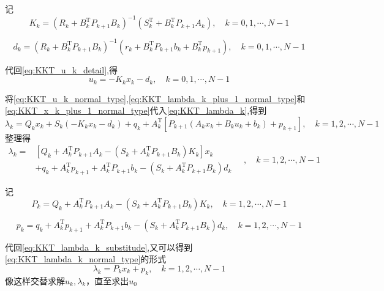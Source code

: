\documentclass[withoutpreface,bwprint]{NoteBook}
\begin{document}
记
\begin{equation}
\label{eq:KKT_K_k_detail}
K_{k} = \left( R_{k}+B_{k}^\mathrm{T}P_{k+1} B_{k} \right)^{-1} \left( S_{k}^\mathrm{T} + B_{k}^\mathrm{T} P_{k+1} A_{k} \right) 
, \quad k=0,1,\cdots,N-1
\end{equation}

\begin{equation}
\label{eq:KKT_d_k_detail}
d_{k} = \left( R_{k}+B_{k}^\mathrm{T}P_{k+1} B_{k} \right)^{-1} \left( r_{k}+ B_{k}^\mathrm{T} P_{k+1} b_{k}+B_{k}^\mathrm{T} p_{k+1} \right)
, \quad k=0,1,\cdots,N-1
\end{equation}


代回\cref{eq:KKT_u_k_detail},得
\begin{equation}
\label{eq:KKT_u_k_normal_type}
u_{k} = -K_k x_{k} -d_k
, \quad k=0,1,\cdots,N-1
\end{equation}

将\cref{eq:KKT_u_k_normal_type},\cref{eq:KKT_lambda_k_plus_1_normal_type}和\cref{eq:KKT_x_k_plus_1_normal_type}代入\cref{eq:KKT_lambda_k},得到
$$
\lambda_{k}=Q_k x_k + S_k \left( -K_k x_{k} -d_k \right) +q_k + A_k^\mathrm{T}\left[P_{k+1} \left(A_k x_k + B_k u_k + b_k \right) + p_{k+1}\right]
, \quad k=1,2,\cdots,N-1
$$
整理得
\begin{equation}
\label{eq:KKT_lambda_k_substitude}
\begin{aligned}
\lambda_{k} =& \left[ Q_{k} +  A_{k}^\mathrm{T}P_{k+1} A_{k} - \left( S_{k}+ A_{k}^\mathrm{T}P_{k+1} B_{k} \right)K_{k}\right] x_{k} \\
&+q_{k}+A_{k}^\mathrm{T}p_{k+1} + A_{k}^\mathrm{T}P_{k+1} b_{k}
- \left(S_{k}+ A_{k}^\mathrm{T}P_{k+1} B_{k}  \right) d_{k} 
\end{aligned}
\quad,\quad k=1,2,\cdots,N-1
\end{equation}

记
\begin{equation}
\label{eq:KKT_P_k_detail}
P_{k} = Q_{k} +  A_{k}^\mathrm{T}P_{k+1} A_{k} - \left( S_{k}+ A_{k}^\mathrm{T}P_{k+1} B_{k} \right)K_{k} 
,\quad k=1,2,\cdots,N-1
\end{equation}

\begin{equation}
\label{eq:KKT_p_k_detail}
p_{k} = q_{k}+A_{k}^\mathrm{T}p_{k+1} + A_{k}^\mathrm{T}P_{k+1} b_{k}
- \left(S_{k}+ A_{k}^\mathrm{T}P_{k+1} B_{k}  \right) d_{k} 
,\quad k=1,2,\cdots,N-1
\end{equation}


代回\cref{eq:KKT_lambda_k_substitude},又可以得到\cref{eq:KKT_lambda_k_normal_type}的形式
$$
\lambda_{k} = P_k x_{k} +p_k
,\quad k=1,2,\cdots,N-1
$$
像这样交替求解$u_k,\lambda_{k}$，直至求出$u_0$​
\end{document}
